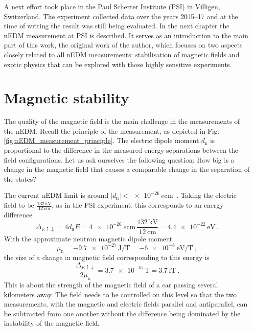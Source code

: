 A next effort took place in the Paul Scherrer Institute (PSI) in Villigen, Switzerland.
The experiment collected data over the years 2015--17 and at the time of writing the result was still being evaluated.
In the next chapter the nEDM measurement at PSI is described.
It serves as an introduction to the main part of this work, the original work of the author, which focuses on two aspects closely related to all nEDM measurements: stabilisation of magnetic fields and exotic physics that can be explored with those highly sensitive experiments.



\section{Magnetic stability}
The quality of the magnetic field is the main challenge in the measurements of the nEDM\@. Recall the principle of the measurement, as depicted in Fig.\,\ref{fig:nEDM_measurement_principle}. The electric dipole moment $d_\text{n}$ is proportional to the difference in the measured energy separations between the field configurations. Let us ask ourselves the following question: How big is a change in the magnetic field that causes a comparable change in the separation of the states?

The current nEDM limit is around $|d_\text{n}| < \SI{e-26}{\elementarycharge\centi\meter}$~\cite{PhysRevLett.97.131801}. Taking the electric field to be $\frac{ \SI{132}{\kilo\volt} }{ \SI{12}{\centi\meter} }$, as in the PSI experiment, this corresponds to an energy difference
\begin{equation}
  \Delta_{E\uparrow\downarrow} = 4 d_\text{n} E = \SI{4e-26}{\elementarycharge\centi\meter} \ \frac{ \SI{132}{\kilo\volt} }{ \SI{12}{\centi\meter} } = \SI{4.4e-22}{\electronvolt} \ .
\end{equation}
With the approximate neutron magnetic dipole moment~\cite{Green1982}
\begin{equation}
  \mu_\text{n} = \SI{-9.7e-27}{\joule\per\tesla} = \SI{-6e-8}{\electronvolt\per\tesla} \ ,
\end{equation}
the size of a change in magnetic field corresponding to this energy is
\begin{equation}
  \frac{ \Delta_{E\uparrow\downarrow} }{2 \mu_n} = \SI{3.7e-15}{\tesla} = \SI{3.7}{\femto\tesla} \ .
\end{equation}
This is about the strength of the magnetic field of a car passing several kilometers away. The field needs to be controlled on this level so that the two measurements, with the magnetic and electric fields parallel and antiparallel, can be subtracted from one another without the difference being dominated by the instability of the magnetic field.

